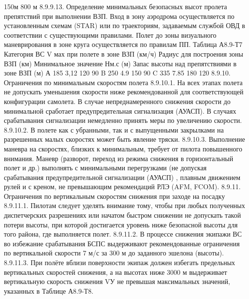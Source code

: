 		150м					800 м													
8.9.9.13. Определение минимальных безопасных высот пролета препятствий при выполнении ВЗП.
Вход в зону аэродрома осуществляется по установленным схемам (STAR) или по траекториям, задаваемым службой ОВД в соответствии с существующими правилами.
Полет до зоны визуального маневрирования в зоне круга осуществляется по правилам ПП.
                                                                                                                                          Таблица А8.9-Т7
Категория ВС	V мах при полете в зоне ВЗП (км/ч)	Радиус для построения зоны ВЗП (км)	Минимальное значение Нм.с     (м)	Запас высоты над 
препятствиями в зоне ВЗП (м)
А	185	3,12	120	90
B	250	4.9	150	90
C	335	7.85	180	120
8.9.10.	Ограничения по минимальным скоростям полета
8.9.10.1. На всех этапах полета не допускать уменьшения скорости ниже рекомендованной для соответствующей конфигурации самолета. В случае непреднамеренного снижения скорости до минимальной сработает предупредительная сигнализация (АУАСП). В случаях срабатывания сигнализации немедленно принять меры по увеличению скорости.
8.9.10.2. В полете как с убранными, так и с выпущенными закрылками на разрешенных малых скоростях может быть явление тряски.
8.9.10.3. Выполнение маневра на скоростях, близких к минимальным, требует от пилота повышенного внимания. Маневр (разворот, переход из режима снижения в горизонтальный полет и др.) выполнять с минимальными перегрузками (не допуская срабатывания предупредительной сигнализации (АУАСП) , плавным движением рулей и с креном, не превышающим рекомендаций РЛЭ (AFM, FCOM).
8.9.11.	Ограничения по вертикальным скоростям снижения при заходе на посадку
8.9.11.1. Пилотам следует уделять внимание тому, чтобы при любых полученных диспетчерских разрешениях или начатом быстром снижении не допускать такой потери высоты, при которой достигается уровень ниже безопасной высоты для того района, где выполняется полет.
8.9.11.2. В процессе снижения экипажи ВС во избежание срабатывания БСПС выдерживают рекомендованные ограничения по вертикальной скорости 7 м/с за 300 м до заданного эшелона (высоты).
8.9.11.3. При полёте вблизи поверхности экипаж должен избегать предельных вертикальных скоростей снижения, а на высотах ниже 3000 м выдерживает вертикальную скорость снижения VУ не превышая максимальных значений, указанных в Таблице А8.9-Т8. 

